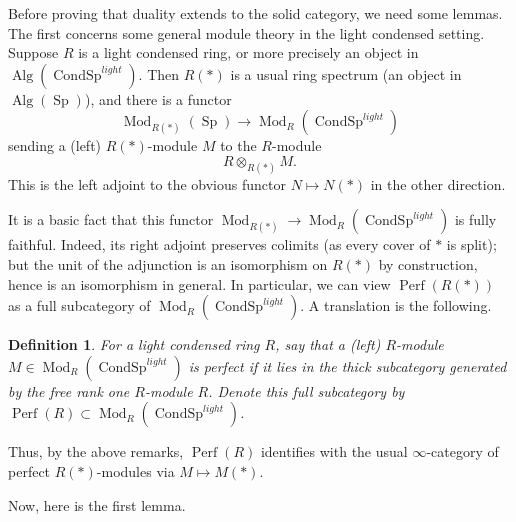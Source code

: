\documentclass[12pt]{article}
\newtheorem{definition}[theorem]{Definition}
\newcommand{\on}{\operatorname}
\begin{document}
Before proving that duality extends to the solid category, we need some lemmas.  The first concerns some general module theory in the light condensed setting.  Suppose $R$ is a light condensed ring, or more precisely an object in $\on{Alg}(\on{CondSp}^{light})$.  Then $R(\ast)$ is a usual ring spectrum (an object in $\on{Alg}(\on{Sp})$), and there is a functor
$$\on{Mod}_{R(\ast)}(\on{Sp}) \to \on{Mod}_R(\on{CondSp}^{light})$$
sending a (left) $R(\ast)$-module $M$ to the $R$-module
$$R\otimes_{R(\ast)}M.$$
This is the left adjoint to the obvious functor $N\mapsto N(\ast)$ in the other direction.

It is a basic fact that this functor $\on{Mod}_{R(\ast)} \to \on{Mod}_R(\on{CondSp}^{light})$ is fully faithful.  Indeed, its right adjoint preserves colimits (as every cover of $\ast$ is split); but the unit of the adjunction is an isomorphism on $R(\ast)$ by construction, hence is an isomorphism in general.  In particular, we can view $\on{Perf}(R(\ast))$ as a full subcategory of $\on{Mod}_R(\on{CondSp}^{light})$.  A translation is the following.

\begin{definition}
For a light condensed ring $R$, say that a (left) $R$-module $M\in\on{Mod}_R(\on{CondSp}^{light})$ is \emph{perfect} if it lies in the thick subcategory generated by the free rank one $R$-module $R$.  Denote this full subcategory by
$\on{Perf}(R)\subset \on{Mod}_R(\on{CondSp}^{light})$.
\end{definition}

Thus, by the above remarks, $\on{Perf}(R)$ identifies with the usual $\infty$-category of perfect $R(\ast)$-modules via $M\mapsto M(\ast)$.

Now, here is the first lemma.
\end{document}

